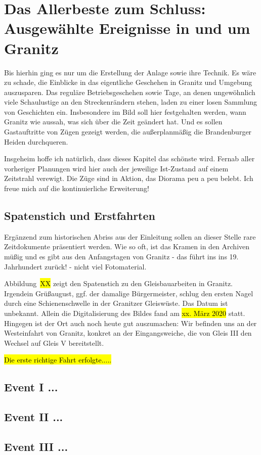 \section{Das Allerbeste zum Schluss: Ausgew\"ahlte Ereignisse in und um Granitz}
\label{sec:events}

Bis hierhin ging es nur um die Erstellung der Anlage sowie ihre Technik.
Es w\"are zu schade, die Einblicke in das eigentliche Geschehen in Granitz und Umgebung auszusparen.
Das regul\"are Betriebsgeschehen sowie Tage, an denen ungew\"ohnlich viele Schaulustige an den Streckenr\"andern stehen, laden zu einer losen Sammlung von Geschichten ein.
Insbesondere im Bild soll hier festgehalten werden, wann Granitz wie aussah, was sich \"uber die Zeit ge\"andert hat.
Und es sollen Gastauftritte von Z\"ugen gezeigt werden, die au{\ss}erplanm\"a{\ss}ig die Brandenburger Heiden durchqueren.

Insgeheim hoffe ich nat\"urlich, dass dieses Kapitel das sch\"onste wird.
Fernab aller vorheriger Planungen wird hier auch der jeweilige Ist-Zustand auf einem Zeitstrahl verewigt.
Die Z\"uge sind in Aktion, das Diorama peu a peu belebt.
Ich freue mich auf die kontinuierliche Erweiterung!


\subsection{Spatenstich und Erstfahrten}
\label{sec:firstNail}

Erg\"anzend zum historischen Abriss aus der Einleitung sollen an dieser Stelle rare Zeitdokumente pr\"asentiert werden.
Wie so oft, ist das Kramen in den Archiven m\"u{\ss}ig und es gibt aus den Anfangstagen von Granitz - das f\"uhrt ins ins 19. Jahrhundert zur\"uck! - nicht viel Fotomaterial.

Abbildung~\hl{XX} zeigt den Spatenstich zu den Gleisbauarbeiten in Granitz.
Irgendein Gr\"u{\ss}august, ggf. der damalige B\"urgermeister, schlug den ersten Nagel durch eine Schienenschwelle in der Granitzer Gleisw\"uste.
Das Datum ist unbekannt.
Allein die Digitalisierung des Bildes fand am \hl{xx. M\"arz 2020} statt.
Hingegen ist der Ort auch noch heute gut auszumachen:
Wir befinden uns an der Westeinfahrt von Granitz, konkret an der Eingangsweiche, die von Gleis III den Wechsel auf Gleis V bereitstellt.


\hl{Die erste richtige Fahrt erfolgte.....}



\subsection{Event I ...}

\subsection{Event II ...}

\subsection{Event III ...}